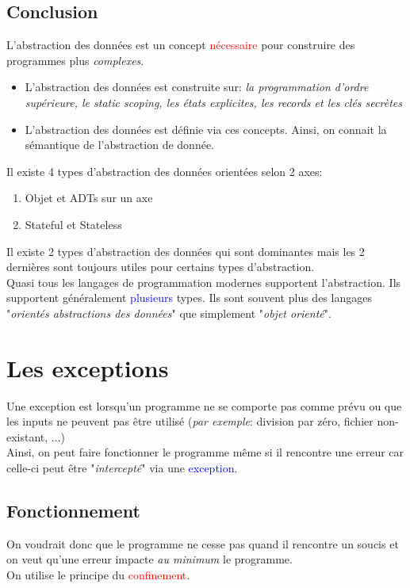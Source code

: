 \documentclass{report}
\begin{document}
\section{Conclusion}
\noindent
L'abstraction des données est un concept \textcolor{red}{nécessaire} pour construire des programmes plus \textit{complexes}.
\begin{itemize}
\item L'abstraction des données est construite sur: \textit{la programmation d'ordre supérieure, le static scoping, les états explicites, les records et les clés secrètes}
\item L'abstraction des données est définie via ces concepts. Ainsi, on connait la sémantique de l'abstraction de donnée.
\end{itemize} 
Il existe 4 types d'abstraction des données orientées selon 2 axes: 
\begin{enumerate}
\item Objet et ADTs sur un axe
\item Stateful et Stateless
\end{enumerate} 
Il existe 2 types d'abstraction des données qui sont dominantes mais les 2 dernières sont toujours utiles pour certains types d'abstraction.\\
Quasi tous les langages de programmation modernes supportent l'abstraction. Ils supportent généralement \textcolor{blue}{plusieurs} types. Ils sont souvent plus des langages "\textit{orientés abstractions des données}" que simplement "\textit{objet orienté}".


\chapter{Les exceptions}
Une exception est lorsqu'un programme ne se comporte pas comme prévu ou que les inputs ne peuvent pas être utilisé (\textit{par exemple}: division par zéro, fichier non-existant, ...)\\
Ainsi, on peut faire fonctionner le programme même si il rencontre une erreur car celle-ci peut être "\textit{intercepté}" via une \textcolor{blue}{exception}.

\section{Fonctionnement}
On voudrait donc que le programme ne cesse pas quand il rencontre un soucis et on veut qu'une erreur impacte \textit{au minimum} le programme.\\
On utilise le principe du \textcolor{red}{confinement}.
\end{document}
